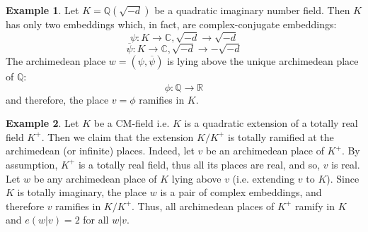 \documentclass[12pt]{article}
\theoremstyle{definition}
\newtheorem{exa}{Example}
\newcommand{\Reals}{\mathbb{R}}
\newcommand{\Complex}{\mathbb{C}}
\newcommand{\Rats}{\mathbb{Q}}
\begin{document}
\begin{exa}
Let $K=\Rats(\sqrt{-d})$ be a quadratic imaginary number field. Then $K$ has only two embeddings which, in fact, are complex-conjugate embeddings:
 $$\psi\colon K \to \Complex, \sqrt{-d} \to \sqrt{-d}$$
$$\overline{\psi}\colon K \to \Complex, \sqrt{-d} \to - \sqrt{-d}$$
The archimedean place $w=(\psi,\overline{\psi})$ is lying above the unique archimedean place of $\Rats$:
$$\phi\colon \Rats \to \Reals$$
and therefore, the place $v=\phi$ ramifies in $K$.
\end{exa}

\begin{exa}
Let $K$ be a CM-field i.e. $K$ is a  quadratic extension of a totally real field $K^+$. Then we claim that the extension $K/K^+$ is totally ramified at the archimedean (or infinite) places. Indeed, let $v$ be an archimedean place of $K^+$. By assumption, $K^+$ is a totally real field, thus all its places are real, and so, $v$ is real. Let $w$ be any archimedean place of $K$ lying above $v$ (i.e. extending $v$ to $K$). Since $K$ is totally imaginary, the place $w$ is a pair of complex embeddings, and therefore $v$ ramifies in $K/K^+$. Thus, all archimedean places of $K^+$ ramify in $K$ and $e(w|v)=2$ for all $w|v$. 
\end{exa}
\end{document}
